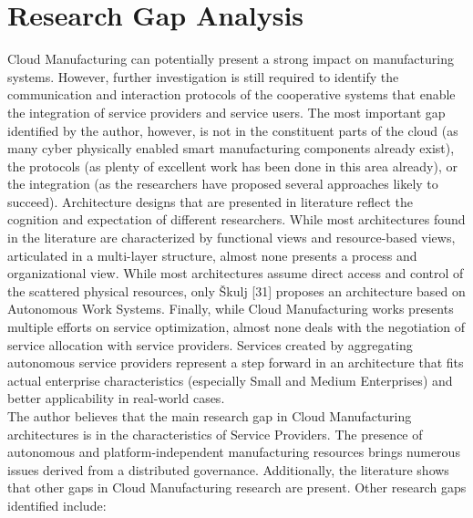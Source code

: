 \section{Research Gap Analysis}
Cloud Manufacturing can potentially present a strong impact on manufacturing systems. However, further investigation is still required to identify the communication and interaction protocols of the cooperative systems that enable the integration of service providers and service users. The most important gap identified by the author, however, is not in the constituent parts of the cloud (as many cyber physically enabled smart manufacturing components already exist), the protocols (as plenty of excellent work has been done in this area already), or the integration (as the researchers have proposed several approaches likely to succeed). Architecture designs that are presented in literature reflect the cognition and expectation of different researchers. While most architectures found in the literature are characterized by functional views and resource-based views, articulated in a multi-layer structure, almost none presents a process and organizational view. While most architectures assume direct access and control of the scattered physical resources, only Škulj [31] proposes an architecture based on Autonomous Work Systems. Finally, while Cloud Manufacturing works presents multiple efforts on service optimization, almost none deals with the negotiation of service allocation with service providers. Services created by aggregating autonomous service providers represent a step forward in an architecture that fits actual enterprise characteristics (especially Small and Medium Enterprises) and better applicability in real-world cases.\\
The author believes that the main research gap in Cloud Manufacturing architectures is in the characteristics of Service Providers. The presence of autonomous and platform-independent manufacturing resources brings numerous issues derived from a distributed governance. Additionally, the literature shows that other gaps in Cloud Manufacturing research are present. Other research gaps identified include:
